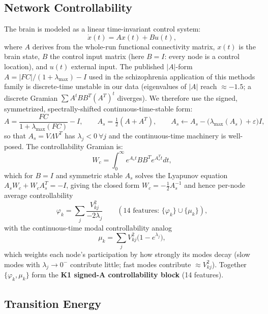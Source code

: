 \documentclass{article}
\begin{document}
\subsection{Network Controllability}

The brain is modeled as a linear time-invariant control system:
\begin{equation}
\dot{x}(t)=Ax(t)+Bu(t),
\end{equation}
where $A$ derives from the whole-run functional connectivity matrix, $x(t)$ is the brain state, $B$ the control input matrix (here $B=I$: every node is a control location), and $u(t)$ external input. The published $|A|$-form $A=|FC|/(1+\lambda_{\max})-I$ used in the schizophrenia application of this methods family is discrete-time unstable in our data (eigenvalues of $|A|$ reach $\approx-1.5$; a discrete Gramian $\sum A^t BB^T (A^T)^t$ diverges). We therefore use the signed, symmetrized, spectrally-shifted continuous-time-stable form:
\begin{equation}
A=\frac{FC}{1+\lambda_{\max}(FC)}-I,\qquad
A_s=\tfrac{1}{2}(A+A^T),\qquad
A_s\leftarrow A_s-\big(\lambda_{\max}(A_s)+\varepsilon\big)I,
\end{equation}
so that $A_s=V\Lambda V^T$ has $\lambda_j<0\ \forall j$ and the continuous-time machinery is well-posed. The controllability Gramian is:
\begin{equation}
W_c=\int_0^{\infty} e^{A_s t}BB^Te^{A_s^{T}t}dt,
\end{equation}
which for $B=I$ and symmetric stable $A_s$ solves the Lyapunov equation $A_s W_c+W_c A_s^{T}=-I$, giving the closed form $W_c=-\tfrac{1}{2}A_s^{-1}$ and hence per-node average controllability
\begin{equation}
\varphi_k=\sum_{j}\frac{V_{kj}^{2}}{-2\lambda_j}\qquad(\text{14 features: }\{\varphi_k\}\cup\{\mu_k\}),
\end{equation}
with the continuous-time modal controllability analog
\begin{equation}
\mu_k=\sum_j V_{kj}^{2}\big(1-e^{\lambda_j}\big),
\end{equation}
which weights each node's participation by how strongly its modes decay (slow modes with $\lambda_j\!\to\!0^-$ contribute little; fast modes contribute $\approx V_{kj}^2$). Together $\{\varphi_k,\mu_k\}$ form the \textbf{K1 signed-A controllability block} (14 features).

\subsection{Transition Energy}
\end{document}
